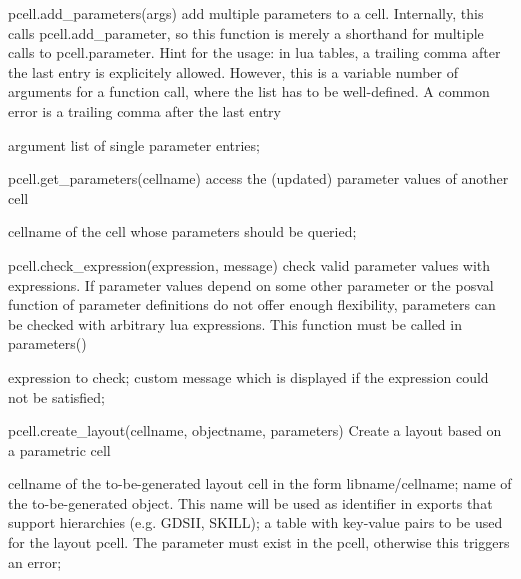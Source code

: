 \begin{APIfunc}{pcell.add\_parameters(args)}
    add multiple parameters to a cell. Internally, this calls pcell.add\_parameter, so this function is merely a shorthand for multiple calls to pcell.parameter. Hint for the usage: in lua tables, a trailing comma after the last entry is explicitely allowed. However, this is a variable number of arguments for a function call, where the list has to be well-defined. A common error is a trailing comma after the last entry
    \begin{APIparameters}
            argument list of single parameter entries;
    \end{APIparameters}
\end{APIfunc}
\begin{APIfunc}{pcell.get\_parameters(cellname)}
    access the (updated) parameter values of another cell
    \begin{APIparameters}
            cellname of the cell whose parameters should be queried;
    \end{APIparameters}
\end{APIfunc}
\begin{APIfunc}{pcell.check\_expression(expression, message)}
    check valid parameter values with expressions. If parameter values depend on some other parameter or the posval function of parameter definitions do not offer enough flexibility, parameters can be checked with arbitrary lua expressions. This function must be called in parameters()
    \begin{APIparameters}
            expression to check;
            custom message which is displayed if the expression could not be satisfied;
    \end{APIparameters}
\end{APIfunc}
\begin{APIfunc}{pcell.create\_layout(cellname, objectname, parameters)}
    Create a layout based on a parametric cell
    \begin{APIparameters}
            cellname of the to-be-generated layout cell in the form libname/cellname;
            name of the to-be-generated object. This name will be used as identifier in exports that support hierarchies (e.g. GDSII, SKILL);
            a table with key-value pairs to be used for the layout pcell. The parameter must exist in the pcell, otherwise this triggers an error;
    \end{APIparameters}
\end{APIfunc}
